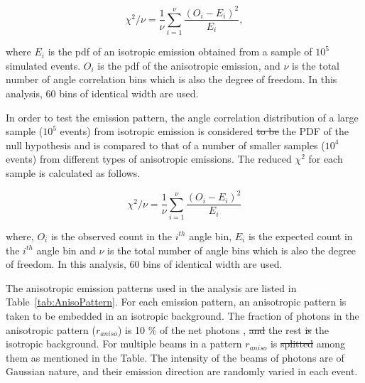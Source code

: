 \begin{equation}
\chi^2/\nu = \frac{1}{\nu} \sum^{\nu}_{i=1} \frac{(O_i - E_i)^2}{E_i},
\label{redchi2}
\end{equation}

where $E_i$ is the pdf of an isotropic emission obtained from a sample of $10^5$ simulated events. $O_i$ is the pdf of the anisotropic emission, and $\nu$ is the total number of angle correlation bins which is also the degree of freedom. In this analysis, 60 bins of identical width are used.


In order to test the emission pattern, the angle correlation distribution of a large sample ($10^5$ events) 
from isotropic emission is considered \sout{to be} the PDF of the null hypothesis and is compared 
to that of a number of smaller samples ($10^4$ events) from different types of anisotropic emissions. 
The reduced $\chi^2$ for each sample is calculated as follows.

\begin{equation}
\chi^2/\nu = \frac{1}{\nu} \sum^{\nu}_{i=1} \frac{(O_i - E_i)^2}{E_i}
\label{redchi2}
\end{equation}

where, $O_i$ is the observed count in the $i^{th}$ angle bin, $E_i$ is the expected count in the $i^{th}$ 
angle bin and $\nu$ is the total number of angle bins which is also the degree of freedom. In this analysis, 
60 bins of identical width are used. 


The anisotropic emission patterns used in the analysis are listed 
in Table~\ref{tab:AnisoPattern}. For each emission pattern,  an anisotropic pattern is taken to be embedded 
in an isotropic background. The fraction of photons in the anisotropic pattern ($r_{aniso}$) is 10 \% of the net photons ,
\sout{and} the rest \sout{is}  the isotropic background. For multiple beams in a pattern $r_{aniso}$ is \sout{splitted}  among them 
as mentioned in the Table. The intensity of the beams of photons are of Gaussian nature, and their emission direction are 
randomly varied in each event.

